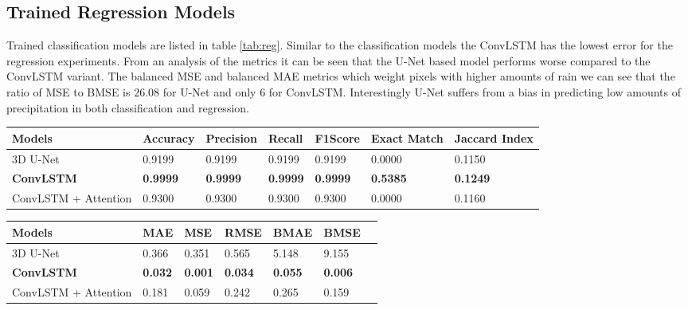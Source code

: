 \subsection{Trained Regression Models}
Trained classification models are listed in table \ref{tab:reg}. Similar to the classification models the ConvLSTM
has the lowest error for the regression experiments. From an analysis of the metrics it can be seen that the U-Net based model performs worse compared to the ConvLSTM variant.
The balanced MSE and balanced MAE metrics which weight pixels with higher amounts of rain we can see that the ratio of MSE to BMSE
is $26.08$ for U-Net and only $6$ for ConvLSTM. Interestingly U-Net suffers from a bias 
in predicting low amounts of precipitation in both classification and regression.



\begin{table*}[h]
  \caption[short]{Metrics on Test Set for variants of classification models trained on 50 epochs.}
  \begin{tabular}{@{}lllllll@{}}
  \toprule
  Models               & Accuracy & Precision & Recall & F1Score & Exact Match & Jaccard Index \\ \midrule
  3D U-Net             & 0.9199   & 0.9199    & 0.9199 & 0.9199  & 0.0000      & 0.1150        \\
  \textbf{ConvLSTM}    & \textbf{0.9999}   &  \textbf{0.9999}    & \textbf{0.9999} & \textbf{0.9999}  & \textbf{0.5385}      & \textbf{0.1249}        \\
  ConvLSTM + Attention & 0.9300   & 0.9300    & 0.9300 & 0.9300  & 0.0000      & 0.1160 
  \end{tabular}
  \label{tab:class}
\end{table*}

\begin{table*}[h]
  \caption[short]{Metrics on Test Set for variants of regression models trained on 50 epochs.}
  \begin{tabular}{@{}lllllll@{}}
  \toprule
  Models                & MAE & MSE & RMSE & BMAE & BMSE \\ \midrule
  3D U-Net              & 0.366  & 	0.351  & 0.565 & 	5.148  & 9.155 \\
    \textbf{ConvLSTM}   & \textbf{0.032}   &  \textbf{0.001} & \textbf{0.034} & \textbf{0.055}  & \textbf{0.006}  \\
  ConvLSTM + Attention  & 0.181   & 0.059 & 0.242 & 0.265  & 0.159  \\
  \end{tabular}
  \label{tab:reg}
\end{table*}